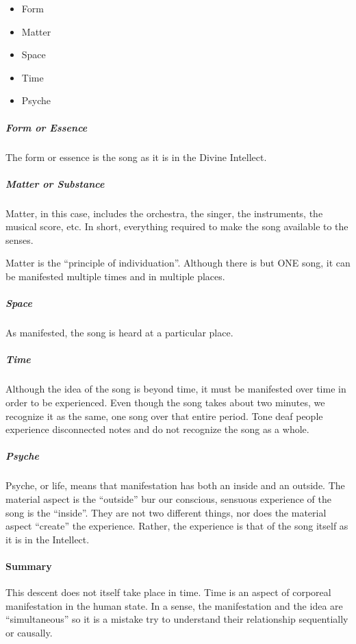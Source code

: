 \begin{itemize}


\item Form

\item Matter

\item Space

\item Time

\item Psyche
\end{itemize}


\subparagraph{Form or Essence}


The form or essence is the song as it is in the Divine Intellect.

\subparagraph{Matter or Substance}


Matter, in this case, includes the orchestra, the singer, the instruments, the musical score, etc. In short, everything required to make the song available to the senses.

Matter is the ``principle of individuation''. Although there is but ONE song, it can be manifested multiple times and in multiple places.

\subparagraph{Space}


As manifested, the song is heard at a particular place.

\subparagraph{Time}


Although the idea of the song is beyond time, it must be manifested over time in order to be experienced. Even though the song takes about two minutes, we recognize it as the same, one song over that entire period. Tone deaf people experience disconnected notes and do not recognize the song as a whole.

\subparagraph{Psyche}


Psyche, or life, means that manifestation has both an inside and an outside. The material aspect is the ``outside'' bur our conscious, sensuous experience of the song is the ``inside''. They are not two different things, nor does the material aspect ``create'' the experience. Rather, the experience is that of the song itself as it is in the Intellect.

\paragraph{Summary}


This descent does not itself take place in time. Time is an aspect of corporeal manifestation in the human state. In a sense, the manifestation and the idea are ``simultaneous'' so it is a mistake try to understand their relationship sequentially or causally.

